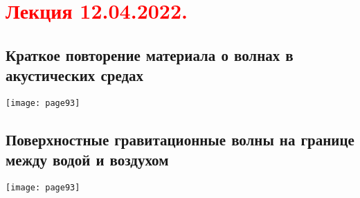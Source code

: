 \documentclass[main.tex]{subfiles}
\begin{document}
\section{\textcolor{red}{Лекция 12.04.2022.}}

\subsection{Краткое повторение материала о волнах в акустических средах}
\texttt{[image: page93]}

\subsection{Поверхностные гравитационные волны на границе между водой и воздухом}
\texttt{[image: page93]}





\end{document}
